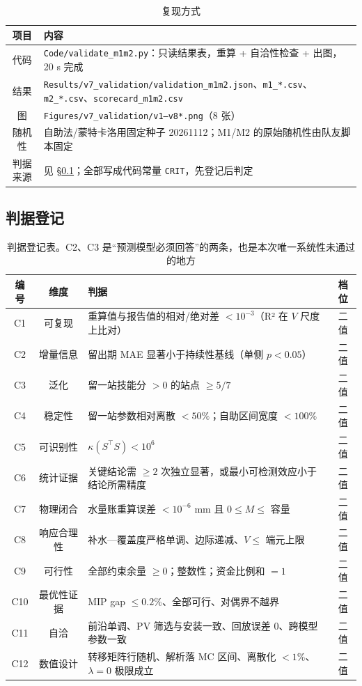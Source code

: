 \documentclass[11pt,a4paper]{ctexart}
\begin{document}
\begin{table}[htbp]\centering\small
\begin{tabularx}{\textwidth}{|c|X|}
\toprule
项目 & 内容 \\
\midrule
代码 & \texttt{Code/validate\_m1m2.py}：只读结果表，重算 + 自洽性检查 + 出图，20 s 完成 \\
结果 & \texttt{Results/v7\_validation/validation\_m1m2.json}、\texttt{m1\_*.csv}、\texttt{m2\_*.csv}、\texttt{scorecard\_m1m2.csv} \\
图 & \texttt{Figures/v7\_validation/v1—v8*.png}（8 张） \\
随机性 & 自助法/蒙特卡洛用固定种子 20261112；M1/M2 的原始随机性由队友脚本固定 \\
判据来源 & 见 \S\ref{sec:crit}；全部写成代码常量 \texttt{CRIT}，先登记后判定 \\
\bottomrule
\end{tabularx}
\caption{复现方式}\label{tab:repro}
\end{table}

\subsection{判据登记}\label{sec:crit}

\begin{table}[htbp]\centering\small
\begin{tabularx}{\textwidth}{|c|c|X|c|}
\toprule
编号 & 维度 & 判据 & 档位 \\
\midrule
C1 & 可复现 & 重算值与报告值的相对/绝对差 $<10^{-3}$（R² 在 $V$ 尺度上比对） & 二值 \\
C2 & 增量信息 & 留出期 MAE 显著小于持续性基线（单侧 $p<0.05$） & 二值 \\
C3 & 泛化 & 留一站技能分 $>0$ 的站点 $\ge5/7$ & 二值 \\
C4 & 稳定性 & 留一站参数相对离散 $<50\%$；自助区间宽度 $<100\%$ & 二值 \\
C5 & 可识别性 & $\kappa(S^{\top}S)<10^{6}$ & 二值 \\
C6 & 统计证据 & 关键结论需 $\ge2$ 次独立显著，或最小可检测效应小于结论所需精度 & 二值 \\
C7 & 物理闭合 & 水量账重算误差 $<10^{-6}$ mm 且 $0\le M\le$ 容量 & 二值 \\
C8 & 响应合理性 & 补水—覆盖度严格单调、边际递减、$V\le$ 端元上限 & 二值 \\
C9 & 可行性 & 全部约束余量 $\ge0$；整数性；资金比例和 $=1$ & 二值 \\
C10 & 最优性证据 & MIP gap $\le0.2\%$、全部可行、对偶界不越界 & 二值 \\
C11 & 自洽 & 前沿单调、PV 筛选与安装一致、回放误差 0、跨模型参数一致 & 二值 \\
C12 & 数值设计 & 转移矩阵行随机、解析落 MC 区间、离散化 $<1\%$、$\lambda=0$ 极限成立 & 二值 \\
\bottomrule
\end{tabularx}
\caption{判据登记表。C2、C3 是“预测模型必须回答”的两条，也是本次唯一系统性未通过的地方}\label{tab:crit}
\end{table}
\end{document}
